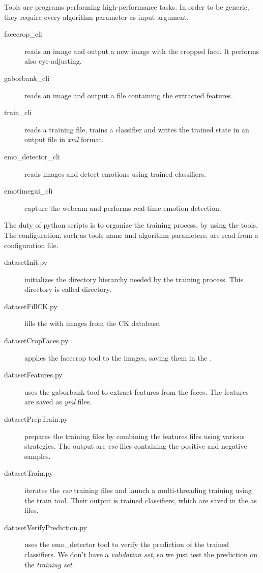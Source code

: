 Tools are  programs performing high-performance tasks. In order
to be generic, they require every algorithm parameter as input argument.

\begin{description}
  \item[facecrop\_cli] reads an image and output a new image with the cropped
    face. It performs also eye-adjusting.
  \item[gaborbank\_cli] reads an image and output a file containing the
    extracted features.
  \item[train\_cli] reads a training file, trains a classifier and writes the
    trained state in an output file in \emph{xml} format.
  \item[emo\_detector\_cli] reads images and detect emotions using trained
    classifiers.
  \item[emotimegui\_cli] capture the webcam and performs real-time emotion
    detection.
\end{description}

The duty of python scripts is to organize the training process, by using the
 tools. The configuration, such as tools name and algorithm
parameters, are read from a configuration file.

\begin{description}
  \item[datasetInit.py] initializes the directory hierarchy needed by the
    training process. This directory is called  directory.
  \item[datasetFillCK.py] fills the  with images from the CK database.
  \item[datasetCropFaces.py] applies the facecrop tool to the images, saving
    them in the .
  \item[datasetFeatures.py] uses the gaborbank tool to extract features from
    the faces. The features are saved as \emph{yml} files.
  \item[datasetPrepTrain.py] prepares the training files by combining the
    features files using various strategies. The output are \emph{csv} files
    containing the positive and negative samples.
  \item[datasetTrain.py] iterates the \emph{csv} training files and launch a
    multi-threading training using the train tool. Their output is trained
    classifiers, which are saved in the  as  files.
  \item[datasetVerifyPrediction.py] uses the emo\_detector tool to verify the
    prediction of the trained classifiers. We don't have a \emph{validation
    set}, so we just test the prediction on the \emph{training set}.
\end{description}
